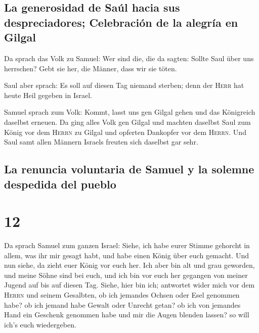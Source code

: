 \hypertarget{la-generosidad-de-sauxfal-hacia-sus-despreciadores-celebraciuxf3n-de-la-alegruxeda-en-gilgal}{%
\subsection{La generosidad de Saúl hacia sus despreciadores; Celebración
de la alegría en
Gilgal}\label{la-generosidad-de-sauxfal-hacia-sus-despreciadores-celebraciuxf3n-de-la-alegruxeda-en-gilgal}}

 Da sprach das Volk zu Samuel: Wer sind die, die da
sagten: Sollte Saul über uns herrschen? Gebt sie her, die Männer, dass
wir sie töten.

 Saul aber sprach: Es soll auf diesen Tag niemand
sterben; denn der \textsc{Herr} hat heute Heil gegeben in Israel.

 Samuel sprach zum Volk: Kommt, lasst uns gen Gilgal
gehen und das Königreich daselbst erneuen.  Da ging alles
Volk gen Gilgal und machten daselbst Saul zum König vor dem
\textsc{Herrn} zu Gilgal und opferten Dankopfer vor dem \textsc{Herrn}.
Und Saul samt allen Männern Israels freuten sich daselbst gar sehr.

\hypertarget{la-renuncia-voluntaria-de-samuel-y-la-solemne-despedida-del-pueblo}{%
\subsection{La renuncia voluntaria de Samuel y la solemne despedida del
pueblo}\label{la-renuncia-voluntaria-de-samuel-y-la-solemne-despedida-del-pueblo}}

\hypertarget{section-11}{%
\section{12}\label{section-11}}

 Da sprach Samuel zum ganzen Israel: Siehe, ich habe eurer
Stimme gehorcht in allem, was ihr mir gesagt habt, und habe einen König
über euch gemacht.  Und nun siehe, da zieht euer König vor
euch her. Ich aber bin alt und grau geworden, und meine Söhne sind bei
euch, und ich bin vor euch her gegangen von meiner Jugend auf bis auf
diesen Tag.  Siehe, hier bin ich; antwortet wider mich vor
dem \textsc{Herrn} und seinem Gesalbten, ob ich jemandes Ochsen oder
Esel genommen habe? ob ich jemand habe Gewalt oder Unrecht getan? ob ich
von jemandes Hand ein Geschenk genommen habe und mir die Augen blenden
lassen? so will ich's euch wiedergeben.

